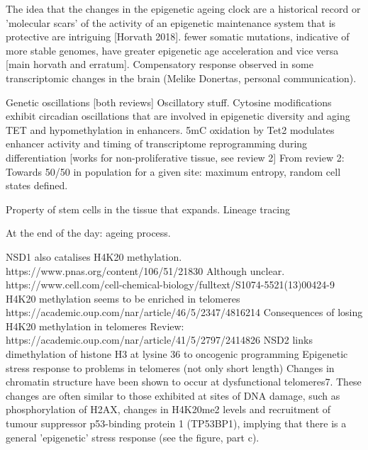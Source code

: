 The idea that the changes in the epigenetic ageing clock are a historical record or 'molecular scars' of the activity of an epigenetic maintenance system that is protective are intriguing [Horvath 2018]. fewer somatic mutations, indicative of more stable genomes, have greater epigenetic age acceleration and vice versa [main horvath and erratum]. Compensatory response observed in some transcriptomic changes in the brain (Melike Donertas, personal communication). 

Genetic oscillations [both reviews]
Oscillatory stuff.
Cytosine modifications exhibit circadian oscillations that are involved in epigenetic diversity and aging
TET and hypomethylation in enhancers. 5mC oxidation by Tet2 modulates enhancer activity and timing of transcriptome reprogramming during differentiation [works for non-proliferative tissue, see review 2]
From review 2:
Towards 50/50 in population for a given site: maximum entropy, random cell states defined.

Property of stem cells in the tissue that expands. Lineage tracing 



At the end of the day: ageing process. 



NSD1 also catalises H4K20 methylation.
https://www.pnas.org/content/106/51/21830
Although unclear.
https://www.cell.com/cell-chemical-biology/fulltext/S1074-5521(13)00424-9
H4K20 methylation seems to be enriched in telomeres
https://academic.oup.com/nar/article/46/5/2347/4816214
Consequences of losing H4K20 methylation in telomeres
Review:
https://academic.oup.com/nar/article/41/5/2797/2414826
NSD2 links dimethylation of histone H3 at lysine 36 to oncogenic programming
Epigenetic stress response to problems in telomeres (not only short length)
Changes in chromatin structure have been shown to occur at dysfunctional telomeres7. These changes are often similar to those exhibited at sites of DNA damage, such as phosphorylation of H2AX, changes in H4K20me2 levels and recruitment of tumour suppressor p53-binding protein 1 (TP53BP1), implying that there is a general 'epigenetic' stress response (see the figure, part c).
